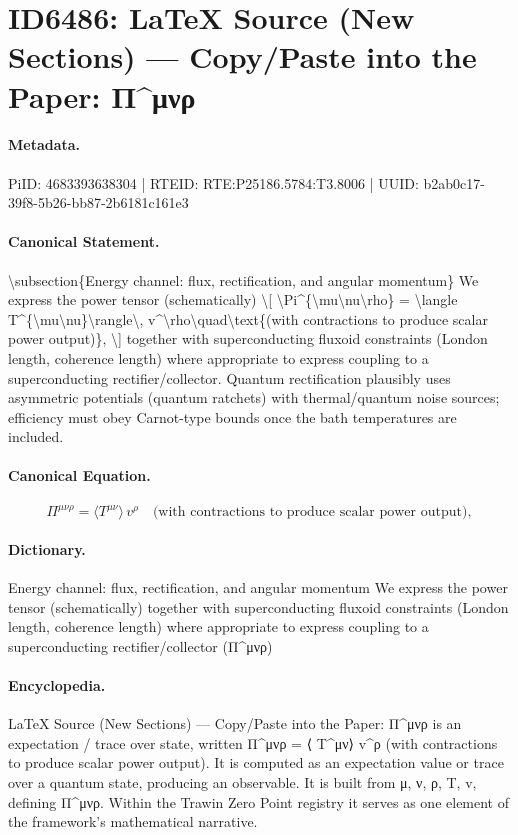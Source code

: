 \section*{ID6486: LaTeX Source (New Sections) — Copy/Paste into the Paper: Π\textasciicircum{}μνρ}
\paragraph{Metadata.}
PiID: 4683393638304 | RTEID: RTE:P25186.5784:T3.8006 | UUID: b2ab0c17-39f8-5b26-bb87-2b6181c161e3

\paragraph{Canonical Statement.}
\textbackslash{}subsection\{Energy channel: flux, rectification, and angular momentum\} We express the power tensor (schematically) \textbackslash{}[ \textbackslash{}Pi\textasciicircum{}\{\textbackslash{}mu\textbackslash{}nu\textbackslash{}rho\} = \textbackslash{}langle T\textasciicircum{}\{\textbackslash{}mu\textbackslash{}nu\}\textbackslash{}rangle\textbackslash{}, v\textasciicircum{}\textbackslash{}rho\textbackslash{}quad\textbackslash{}text\{(with contractions to produce scalar power output)\}, \textbackslash{}] together with superconducting fluxoid constraints (London length, coherence length) where appropriate to express coupling to a superconducting rectifier/collector. Quantum rectification plausibly uses asymmetric potentials (quantum ratchets) with thermal/quantum noise sources; efficiency must obey Carnot-type bounds once the bath temperatures are included.

\paragraph{Canonical Equation.}
\[
\Pi^{\mu\nu\rho} = \langle T^{\mu\nu}\rangle\, v^\rho\quad\text{(with contractions to produce scalar power output)},
\]

\paragraph{Dictionary.}
Energy channel: flux, rectification, and angular momentum We express the power tensor (schematically) together with superconducting fluxoid constraints (London length, coherence length) where appropriate to express coupling to a superconducting rectifier/collector (Π\textasciicircum{}μνρ)

\paragraph{Encyclopedia.}
LaTeX Source (New Sections) — Copy/Paste into the Paper: Π\textasciicircum{}μνρ is an expectation / trace over state, written Π\textasciicircum{}μνρ = ⟨ T\textasciicircum{}μν⟩ v\textasciicircum{}ρ (with contractions to produce scalar power output). It is computed as an expectation value or trace over a quantum state, producing an observable. It is built from μ, ν, ρ, T, v, defining Π\textasciicircum{}μνρ. Within the Trawin Zero Point registry it serves as one element of the framework's mathematical narrative.
